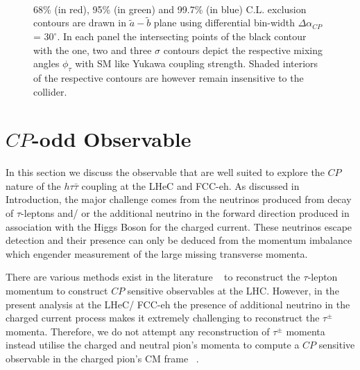 \documentclass[pdftex,twocolumn,epjc3]{svjour3}          %
\begin{document}
\begin{figure*}[t]
	\centering
	\\
\caption{\small 68\% (in red), 95\% (in green) and 99.7\% (in blue)  C.L. exclusion contours are drawn in  $\tilde a-\tilde b$ plane using differential  bin-width $\Delta\alpha_{CP}$ = $30^\circ$. In each panel the  intersecting points of the black contour  with the one, two and three $\sigma $ contours   depict the respective mixing angles $\phi_\tau$ with SM like Yukawa coupling strength. Shaded interiors of the respective contours are however remain insensitive to the collider.}
\label{fig:FCC_Ep50TeV_Ee150GeV}
\end{figure*}
%
\section{$CP$-odd Observable}
\label{obsv}
In this section we discuss the observable that are well suited to explore the $CP$ nature of the $h\tau{\bar\tau}$ coupling at the LHeC and FCC-eh. As discussed in Introduction, the major challenge comes from the neutrinos produced from decay of $\tau$-leptons and/ or the additional neutrino in the forward direction produced in association with the Higgs Boson for the charged current. These neutrinos escape detection and their presence can only be deduced from the momentum imbalance which engender measurement of the large missing transverse momenta. 

\par There are various methods exist in the literature   ~\cite{Ellis:1987xu, Elagin:2010aw, Xia:2016jec, Gripaios:2012th, Maruyama:2015fis, Swain:2014dha, Konar:2015hea, Konar:2016wbh} to reconstruct the $\tau$-lepton momentum to construct $CP$ sensitive observables at the LHC. However, in the present analysis at the LHeC/ FCC-eh the presence of additional neutrino in the charged current process makes it extremely challenging to reconstruct the $\tau^\pm$ momenta. Therefore, we do not attempt any reconstruction of $\tau^\pm$ momenta instead utilise the charged and neutral pion's momenta to compute a $CP$ sensitive observable in the charged pion's CM frame   ~\cite{Berge:2008dr}.   
\end{document}
